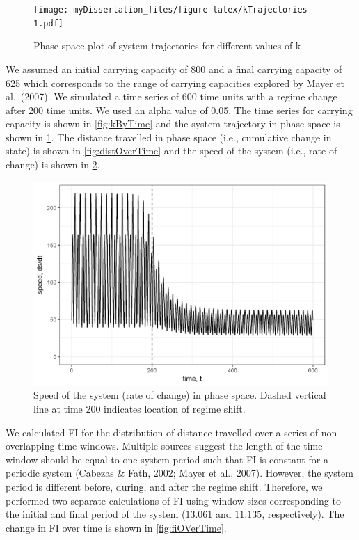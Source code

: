 \documentclass[12pt,twoside]{reedthesis}
\begin{document}
\begin{figure}
\centering
\texttt{[image: myDissertation\_files/figure-latex/kTrajectories-1.pdf]}
\caption{\label{fig:kTrajectories}Phase space plot of system trajectories for different values of k}
\end{figure}
We assumed an initial carrying capacity of 800 and a final carrying capacity of 625 which corresponds to the range of carrying capacities explored by Mayer et al.~(2007). We simulated a time series of 600 time units with a regime change after 200 time units. We used an alpha value of 0.05. The time series for carrying capacity is shown in \ref{fig:kByTime} and the system trajectory in phase space is shown in \ref{fig:kTrajectories}. The distance travelled in phase space (i.e., cumulative change in state) is shown in \ref{fig:distOverTime} and the speed of the system (i.e., rate of change) is shown in \ref{fig:dsdtOverTime}.
\begin{figure}
\includegraphics[width=0.85\linewidth]{./chapterFiles/fiGuide/figures/dsdtOverTime} \caption{Speed of the system (rate of change) in phase space. Dashed vertical line at time 200 indicates location of regime shift.}\label{fig:dsdtOverTime}
\end{figure}
We calculated FI for the distribution of distance travelled over a series of non-overlapping time windows. Multiple sources suggest the length of the time window should be equal to one system period such that FI is constant for a periodic system (Cabezas \& Fath, 2002; Mayer et al., 2007). However, the system period is different before, during, and after the regime shift. Therefore, we performed two separate calculations of FI using window sizes corresponding to the initial and final period of the system (\(13.061\) and \(11.135\), respectively). The change in FI over time is shown in \ref{fig:fiOVerTime}.
\end{document}
